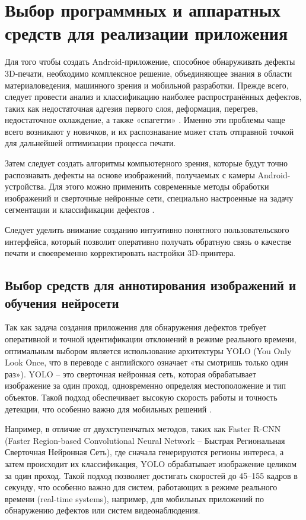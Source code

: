 \chapter{Выбор программных и аппаратных средств для реализации приложения}

Для того чтобы создать Android-приложение, способное обнаруживать дефекты 3D-печати, необходимо комплексное решение, объединяющее знания в области материаловедения, машинного зрения и мобильной разработки. Прежде всего, следует провести анализ и классификацию наиболее распространённых дефектов, таких как недостаточная адгезия первого слоя, деформация, перегрев, недостаточное охлаждение, а также «спагетти» \cite{заикин2023проектирование}. Именно эти проблемы чаще всего возникают у новичков, и их распознавание может стать отправной точкой для дальнейшей оптимизации процесса печати.

Затем следует создать алгоритмы компьютерного зрения, которые будут точно распознавать дефекты на основе изображений, получаемых с камеры Android-устройства. Для этого можно применить современные методы обработки изображений и сверточные нейронные сети, специально настроенные на задачу сегментации и классификации дефектов \cite{измайлов2020анализ}.

Следует уделить внимание созданию интуитивно понятного пользовательского интерфейса, который позволит оперативно получать обратную связь о качестве печати и своевременно корректировать настройки 3D-принтера.

\section{Выбор средств для аннотирования изображений и обучения нейросети}

Так как задача создания приложения для обнаружения дефектов требует оперативной и точной идентификации отклонений в режиме реального времени, оптимальным выбором является использование архитектуры YOLO (You Only Look Once, что в переводе с английского означает «ты смотришь только один раз»). YOLO -- это сверточная нейронная сеть, которая обрабатывает изображение за один проход, одновременно определяя местоположение и тип объектов. Такой подход обеспечивает высокую скорость работы и точность детекции, что особенно важно для мобильных решений \cite{брехт2022применение}.

Например, в отличие от двухступенчатых методов, таких как Faster R-CNN (Faster Region-based Convolutional Neural Network -- Быстрая Региональная Сверточная Нейронная Сеть), где сначала генерируются регионы интереса, а затем происходит их классификация, YOLO обрабатывает изображение целиком за один проход. Такой подход позволяет достигать скоростей до 45–155 кадров в секунду, что особенно важно для систем, работающих в режиме реального времени (real-time systems), например, для мобильных приложений по обнаружению дефектов или систем видеонаблюдения.

